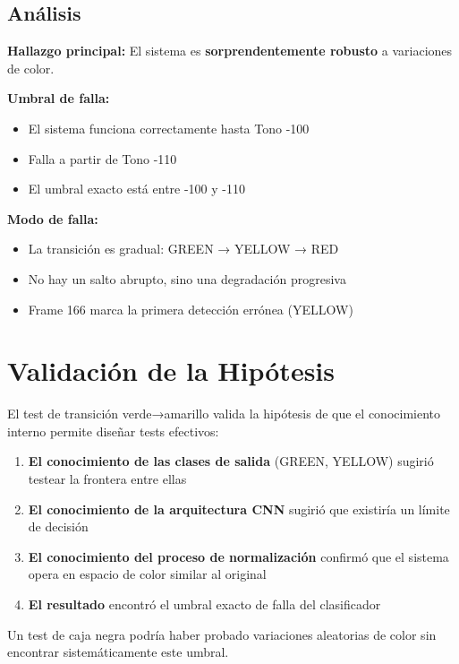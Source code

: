 \subsection{Análisis}

\textbf{Hallazgo principal:} El sistema es \textbf{sorprendentemente robusto} a variaciones de color.

\textbf{Umbral de falla:}
\begin{itemize}
    \item El sistema funciona correctamente hasta Tono -100
    \item Falla a partir de Tono -110
    \item El umbral exacto está entre -100 y -110
\end{itemize}

\textbf{Modo de falla:}
\begin{itemize}
    \item La transición es gradual: GREEN → YELLOW → RED
    \item No hay un salto abrupto, sino una degradación progresiva
    \item Frame 166 marca la primera detección errónea (YELLOW)
\end{itemize}

\section{Validación de la Hipótesis}

El test de transición verde→amarillo valida la hipótesis de que el conocimiento interno permite diseñar tests efectivos:

\begin{enumerate}
    \item \textbf{El conocimiento de las clases de salida} (GREEN, YELLOW) sugirió testear la frontera entre ellas

    \item \textbf{El conocimiento de la arquitectura CNN} sugirió que existiría un límite de decisión

    \item \textbf{El conocimiento del proceso de normalización} confirmó que el sistema opera en espacio de color similar al original

    \item \textbf{El resultado} encontró el umbral exacto de falla del clasificador
\end{enumerate}

Un test de caja negra podría haber probado variaciones aleatorias de color sin encontrar sistemáticamente este umbral.


